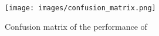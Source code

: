 \begin{figure}[t]
    \centering
    \vspace{-0.5em}
    \texttt{[image: images/confusion\_matrix.png]}
    \caption{\centering Confusion matrix of the performance of \ENACT}
    \vspace{-0.5em}
    \label{fig:conf_mat}
\end{figure}